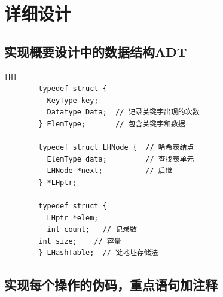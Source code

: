 \documentclass[a4paper]{article}
\begin{document}
	\section{详细设计}\label{sec:design2}

	\subsection{实现概要设计中的数据结构ADT}\label{subsec:adt2}
	\begin{lstlisting}[caption={},label={lst:lstlisting}][H]
        typedef struct {
          KeyType key;
          Datatype Data;  // 记录关键字出现的次数
        } ElemType;       // 包含关键字和数据

        typedef struct LHNode {  // 哈希表结点
          ElemType data;         // 查找表单元
          LHNode *next;          // 后继
        } *LHptr;

        typedef struct {
          LHptr *elem;
          int count;   // 记录数
        int size;    // 容量
        } LHashTable;  // 链地址存储法
	\end{lstlisting}

	\subsection{实现每个操作的伪码，重点语句加注释}\label{subsec:explain}
\end{document}
